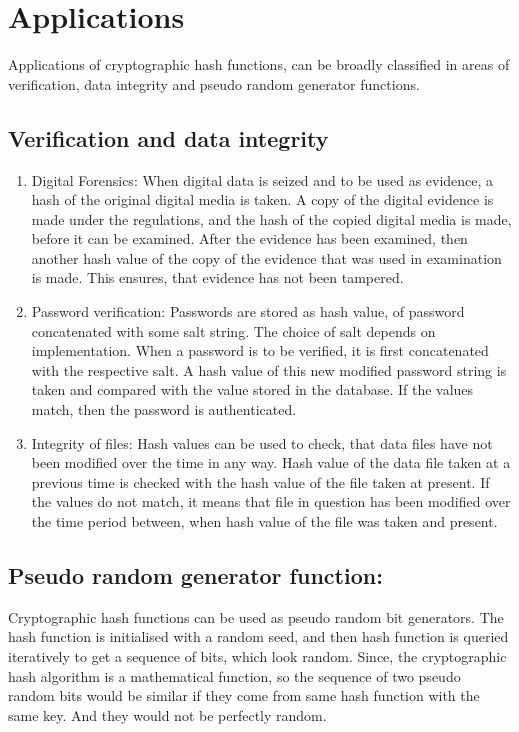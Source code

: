 \section{Applications}

Applications of cryptographic hash functions, can be broadly classified in areas of verification, data
integrity and pseudo random generator functions.

  \subsection{Verification and data integrity}
  \begin{enumerate}

    \item Digital Forensics: When digital data is seized and to be used as evidence, a hash of the original
    digital media is taken. A copy of the digital evidence is made under the regulations, and the hash of the
    copied digital media is made, before it can be examined. After the evidence has been examined, then another
    hash value of the copy of the evidence that was used in examination is made. This ensures, that evidence
    has not been tampered. \cite{00013}

    \item Password verification: Passwords are stored as hash value, of password concatenated with some salt
    string. The choice of salt depends on implementation. When a password is to be verified, it is first 
    concatenated with the respective salt. A hash value of this new modified password string is taken and compared
    with the value stored in the database. If the values match, then the password is authenticated.

    \item Integrity of files: Hash values can be used to check, that data files have not been modified over the
    time in any way. Hash value of the data file taken at a previous time is checked with the hash value of the
    file taken at present. If the values do not match, it means that file in question has been modified over the
    time period between, when hash value of the file was taken and present.
  \end{enumerate}

  \subsection{Pseudo random generator function:}
  Cryptographic hash functions can be used as pseudo random bit generators. The hash function is initialised
  with a random seed, and then hash function is queried iteratively to get a sequence of bits, which look random.
  Since, the cryptographic hash algorithm is a mathematical function, so the sequence of two pseudo random bits 
  would be similar if they come from same hash function with the same key. And they would not be perfectly random.
